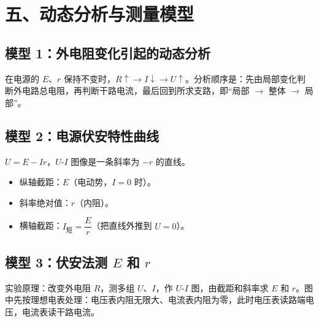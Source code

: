 \section*{五、动态分析与测量模型}

\subsection*{模型 1：外电阻变化引起的动态分析}

在电源的 $E$、$r$ 保持不变时，$R \uparrow \to I \downarrow \to U \uparrow$。分析顺序是：先由局部变化判断外电路总电阻，再判断干路电流，最后回到所求支路，即“局部 $\to$ 整体 $\to$ 局部”。

\begin{center}


\label{fig:closed-circuit-dynamic}
\end{center}

\subsection*{模型 2：电源伏安特性曲线}

$U = E - Ir$，$U$-$I$ 图像是一条斜率为 $-r$ 的直线。
\begin{itemize}
  \item 纵轴截距：$E$（电动势，$I=0$ 时）。
  \item 斜率绝对值：$r$（内阻）。
  \item 横轴截距：$I_{\text{短}}=\dfrac{E}{r}$（把直线外推到 $U=0$）。
\end{itemize}

\begin{center}


\label{fig:source-ui-graph}
\end{center}

\subsection*{模型 3：伏安法测 $E$ 和 $r$}

实验原理：改变外电阻 $R$，测多组 $U$、$I$，作 $U$-$I$ 图，由截距和斜率求 $E$ 和 $r$。图中先按理想电表处理：电压表内阻无限大、电流表内阻为零，此时电压表读路端电压，电流表读干路电流。

\begin{center}


\label{fig:source-measure-circuit}
\end{center}

